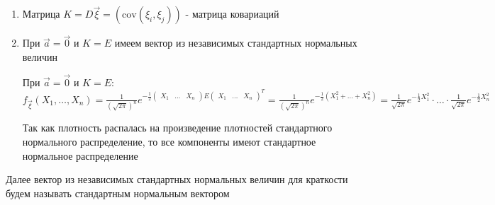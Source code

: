 \documentclass[12pt]{article}
\begin{document}
\begin{enumerate}
    \item Матрица $K = D \vec \xi = \left(\mathrm{cov} (\xi_i, \xi_j)\right)$ - матрица ковариаций

    \item При $\vec a = \vec 0$ и $K = E$ имеем вектор из независимых стандартных нормальных величин

    \begin{MyProof}
        При $\vec a = \vec 0$ и $K = E$: $f_{\vec \xi} (X_1, \dots, X_n) = \frac{1}{\left(\sqrt{2\pi}\right)^n} 
        e^{-\frac{1}{2} \begin{pmatrix}X_1 & \dots & X_n\end{pmatrix} E \begin{pmatrix}X_1 & \dots & X_n\end{pmatrix}^T} = 
        \frac{1}{\left(\sqrt{2\pi}\right)^n} e^{-\frac{1}{2} (X_1^2 + \dots + X_n^2)} = 
        \frac{1}{\sqrt{2\pi}} e^{-\frac{1}{2} X_1^2} \cdot \dots \cdot \frac{1}{\sqrt{2\pi}} e^{-\frac{1}{2} X_n^2}$

        Так как плотность распалась на произведение плотностей стандартного нормального распределение, то все компоненты имеют стандартное нормальное распределение
    \end{MyProof}
\end{enumerate}

Далее вектор из независимых стандартных нормальных величин для краткости будем называть стандартным нормальным вектором
\end{document}
